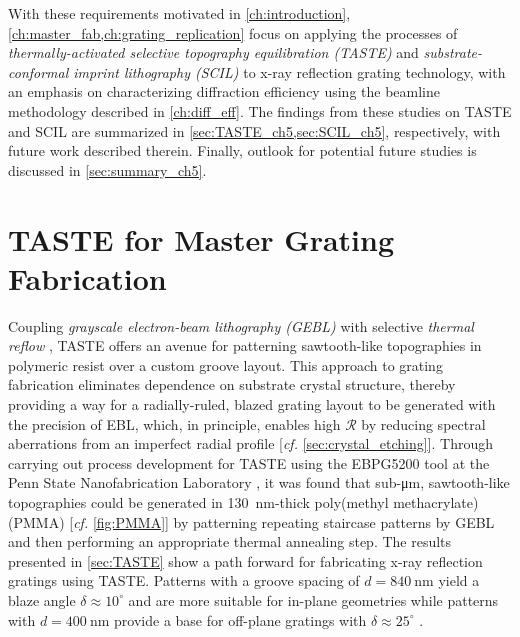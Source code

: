 With these requirements motivated in \cref{ch:introduction}, \cref{ch:master_fab,ch:grating_replication} focus on applying the processes of \emph{thermally-activated selective topography equilibration (TASTE)} \cite{Schleunitz14} and \emph{substrate-conformal imprint lithography (SCIL)} \cite{Verschuuren17} to x-ray reflection grating technology, with an emphasis on characterizing diffraction efficiency using the beamline methodology described in \cref{ch:diff_eff}. 
The findings from these studies on TASTE and SCIL are summarized in \cref{sec:TASTE_ch5,sec:SCIL_ch5}, respectively, with future work described therein. 
Finally, outlook for potential future studies is discussed in \cref{sec:summary_ch5}.

\section{TASTE for Master Grating Fabrication}\label{sec:TASTE_ch5}
Coupling \emph{grayscale electron-beam lithography (GEBL)} with selective \emph{thermal reflow} \cite{Schleunitz10,Schleunitz11a,Schleunitz14,Kirchner19}, TASTE offers an avenue for patterning sawtooth-like topographies in polymeric resist over a custom groove layout. 
This approach to grating fabrication eliminates dependence on substrate crystal structure, thereby providing a way for a radially-ruled, blazed grating layout to be generated with the precision of EBL, which, in principle, enables high $\mathscr{R}$ by reducing spectral aberrations from an imperfect radial profile [\emph{cf.\@} \cref{sec:crystal_etching}]. 
Through carrying out process development for TASTE using the \textsc{EBPG5200} tool at the Penn State Nanofabrication Laboratory \cite[\emph{cf.\@} \cref{fig:ebeam_tool_pic}]{PSU_MRI_EBL,raith_ebpg}, it was found that sub-\si{\um}, sawtooth-like topographies could be generated in \SI{130}{\nm}-thick poly(methyl methacrylate) (PMMA) [\emph{cf.\@} \cref{fig:PMMA}] by patterning repeating staircase patterns by GEBL and then performing an appropriate thermal annealing step. 
The results presented in \cref{sec:TASTE} show a path forward for fabricating x-ray reflection gratings using TASTE. 
Patterns with a groove spacing of $d = \SI{840}{\nm}$ yield a blaze angle $\delta \approx 10^{\circ}$ and are more suitable for in-plane geometries while patterns with $d = \SI{400}{\nm}$ provide a base for off-plane gratings with $\delta \approx 25^{\circ}$ \cite{McCoy18}. 

